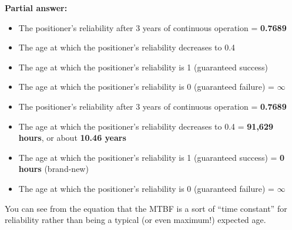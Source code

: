 
\noindent
{\bf Partial answer:}

\begin{itemize}
\item{} The positioner's reliability after 3 years of continuous operation = {\bf 0.7689}
\vskip 5pt 
\item{} The age at which the positioner's reliability decreases to 0.4 
\vskip 5pt 
\item{} The age at which the positioner's reliability is 1 (guaranteed success)
\vskip 5pt 
\item{} The age at which the positioner's reliability is 0 (guaranteed failure) = $\infty$
\end{itemize}







\begin{itemize}
\item{} The positioner's reliability after 3 years of continuous operation = {\bf 0.7689}
\vskip 5pt 
\item{} The age at which the positioner's reliability decreases to 0.4 = {\bf 91,629 hours}, or about {\bf 10.46 years} 
\vskip 5pt 
\item{} The age at which the positioner's reliability is 1 (guaranteed success) = {\bf 0 hours} (brand-new)
\vskip 5pt 
\item{} The age at which the positioner's reliability is 0 (guaranteed failure) = $\infty$
\end{itemize}

\vskip 10pt

You can see from the equation that the MTBF is a sort of ``time constant'' for reliability rather than being a typical (or even maximum!) expected age.




